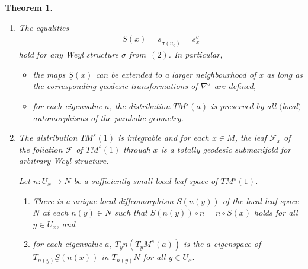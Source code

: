 \documentclass[10pt,a4paper]{amsart}
\newcommand{\si}{\sigma}
\newcommand{\un}{\underline}
\numberwithin{equation}{section}
\newtheorem{Theorem}{Theorem}[section]
\begin{document}
\begin{Theorem}
\begin{enumerate}
\item[$4.$] The equalities \begin{gather*}\un S(x)=\un s_{\si(u_0)}=s_x^\si\end{gather*} hold for any Weyl structure $\si$ from~$(2)$. In particular,
\begin{itemize}\itemsep=0pt
\item the maps $\un S(x)$ can be extended to a larger neighbourhood of $x$ as long as the corresponding geodesic transformations of $\nabla^\si$ are defined,
\item for each eigenvalue $a$, the distribution $TM^s(a)$ is preserved by all $($local$)$ automorphisms of the parabolic geometry.
\end{itemize}
\item[$5.$] The distribution $TM^s(1)$ is integrable and for each $x \in M$, the leaf $\mathcal{F}_x$ of the foliation $\mathcal{F}$ of $TM^s(1)$ through $x$ is a totally geodesic submanifold for arbitrary Weyl structure.

Let $n\colon U_x\to N$ be a sufficiently small local leaf space of $TM^s(1)$.
\begin{enumerate}\itemsep=0pt
\item[$(a)$] There is a unique local diffeomorphism $\un S(n(y))$ of the local leaf space $N$ at each $n(y)\in N$ such that $\un S(n(y))\circ n=n\circ \un S(x)$ holds for all $y\in U_x$, and
\item[$(b)$] for each eigenvalue $a$, $T_yn(T_yM^s(a))$ is the $a$-eigenspace of $T_{n(y)}\un S(n(x))$ in $T_{n(y)}N$ for all $y\in U_x$.
\end{enumerate}
\end{enumerate}
\end{Theorem}
\end{document}
